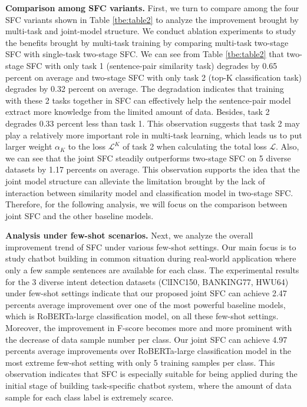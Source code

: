 \documentclass[letterpaper]{article} %
\begin{document}
  \textbf{Comparison  among  SFC  variants.} First, we turn to compare among the
  four  SFC  variants shown in Table \ref{tbe:table2} to analyze the improvement
  brought  by  multi-task  and  joint-model  structure. We conduct
  ablation  experiments  to study the benefits brought by multi-task training by
  comparing multi-task two-stage SFC with single-task two-stage SFC. We can see from
  Table  \ref{tbe:table2}  that  two-stage  SFC  with  only  task 1 (sentence-pair
  similarity task) degrades by 0.65 percent on average and two-stage SFC with only
  task  2  (top-K  classification  task) degrades by 0.32 percent on average. The
  degradation  indicates  that  training  with these 2 tasks together in SFC can
  effectively  help  the  sentence-pair  model  extract  more knowledge from the
  limited  amount  of data. Besides, task 2 degrades 0.33 percent less than task
  1.  This observation suggests that task 2 may play a relatively more important
  role  in multi-task learning, which leads us to put larger weight $\alpha_{K}$
  to  the  loss  $\mathcal{L}^{K}$  of  task  2  when calculating the total loss
  $\mathcal{L}$.  Also, we can see that the joint SFC steadily outperforms
  two-stage  SFC  on  5  diverse  datasets  by  1.17  percents  on  average.  This
  observation  supports  the idea that the joint model structure can
  alleviate the limitation brought by the lack of interaction between similarity
  model  and  classification  model in two-stage SFC. Therefore, for the following
  analysis,  we  will  focus  on  the comparison between joint SFC and the
  other baseline models.

  \textbf{Analysis  under  few-shot  scenarios.}  Next,  we  analyze the overall
  improvement trend of SFC under various few-shot settings. Our main focus is to
  study chatbot building in common situation during real-world application where
  only  a  few  sample  sentences are available for each class. The experimental
  results  for  the  3  diverse  intent detection datasets (ClINC150, BANKING77,
  HWU64) under few-shot settings indicate that our proposed joint SFC can
  achieve  2.47  percents  average  improvement  over  one  of the most powerful
  baseline  models,  which  is  RoBERTa-large classification model, on all these
  few-shot  settings. Moreover, the improvement in F-score becomes more and more
  prominent  with the decrease of data sample number per class. Our joint
  SFC   can  achieve  4.97  percents  average  improvements  over  RoBERTa-large
  classification model in the most extreme few-shot setting with only 5 training
  samples  per class. This observation indicates that SFC is especially suitable
  for  being  applied during the initial stage of building task-specific chatbot
  system,  where  the  amount  of  data sample for each class label is extremely
  scarce.
\end{document}
